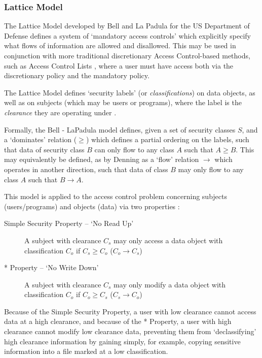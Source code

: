 \pagebreak

\subsubsection{Lattice Model}

The Lattice Model developed by Bell and La Padula for the US Department of Defense \cite{bell1976lattice} defines a system of `mandatory access controls' which explicitly specify what flows of information are allowed and disallowed. This may be used in conjunction with more traditional discretionary Access Control-based methods, such as Access Control Lists \cite{sandhu1993lattice}, where a user must have access both via the discretionary policy and the mandatory policy.

The Lattice Model defines `security labels' (or \textit{classifications}) on data objects, as well as on subjects (which may be users or programs), where the label is the \textit{clearance} they are operating under \cite{denning1976lattice}.

Formally, the Bell - LaPadula model defines, given a set of security classes $ S $, and a `dominates' relation ($ \ge $) \cite{sandhu1993lattice} which defines a partial ordering on the labels, such that data of security class $ B $ can only flow to any class $ A $ such that $ A \ge B $. This may equivalently be defined, as by Denning \cite{denning1976lattice} as a `flow' relation $ \rightarrow $ which operates in another direction, such that data of class $ B $ may only flow to any class $ A $ such that $ B \rightarrow A $.

This model is applied to the access control problem concerning subjects (users/programs) and objects (data) via two properties \cite{bell1973lattice}:

\begin{description}
	\item[Simple Security Property -- `No Read Up'] A subject with clearance $ C_s $ may only access a data object with classification $ C_o $ if $ C_s \ge C_o $ ($ C_o \rightarrow C_s $)
	\item[* Property -- `No Write Down'] A subject with clearance $ C_s $ may only modify a data object with classification $ C_o $ if $ C_o \ge C_s $ ($ C_s \rightarrow C_o $)
\end{description}

Because of the Simple Security Property, a user with low clearance cannot access data at a high clearance, and because of the * Property, a user with high clearance cannot modify low clearance data, preventing them from `declassifying' high clearance information by gaining simply, for example, copying sensitive information into a file marked at a low classification.

